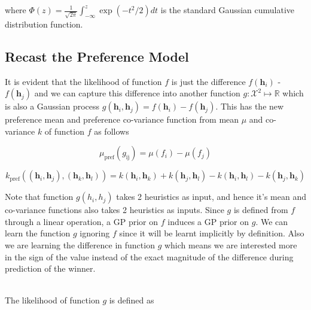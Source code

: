 \documentclass{scrartcl}
\begin{document}
\normalsize 
where $\Phi(z) = \frac{1}{\sqrt{2\pi}} \int_{-\infty}^{z}\exp( -t^2/2) dt$ is the standard Gaussian cumulative distribution function.
	


\subsection {Recast the Preference Model}
	It is evident that the likelihood of function $f$ is just the difference $f(\mathbf{h}_i)$ - $f(\mathbf{h}_j)$ and we can capture this difference into another function $g:\mathcal{X}^2\mapsto\mathbb{R}$ which is also a Gaussian process $g(\mathbf{h}_i,\mathbf{h}_j) = f(\mathbf{h}_i) - f(\mathbf{h}_j)$. This has the new preference mean and preference co-variance function from mean $\mu$ and co-variance $k$ of function $f$ as follows
	
\begin{equation}
\mu_\text{pref}(g_\text{ij}) = \mu(f_i) - \mu(f_j)
\end{equation}


\begin{equation}
k_\text{pref}((\mathbf{h}_i,\mathbf{h}_j),(\mathbf{h}_k,\mathbf{h}_l)) = k(\mathbf{h}_i,\mathbf{h}_k) + k(\mathbf{h}_j,\mathbf{h}_l) - k(\mathbf{h}_i,\mathbf{h}_l) - k(\mathbf{h}_j,\mathbf{h}_k)
\end{equation}

	

Note that function $g(h_i,h_j)$ takes 2 heuristics as input, and hence it's mean and co-variance functions also takes 2 heuristics as inputs. Since  $g$ is defined from $f$ through a linear operation, a GP prior on $f$ induces a GP prior on $g$. We can learn the function $g$ ignoring $f$ since it will be learnt implicitly by definition.
Also we are learning the difference in function $g$ which means we are interested more in the sign of the value instead of the exact magnitude of the difference during prediction of the winner. 

\hfill \\

 The likelihood of function $g$ is defined as 

\hfill 
\end{document}

